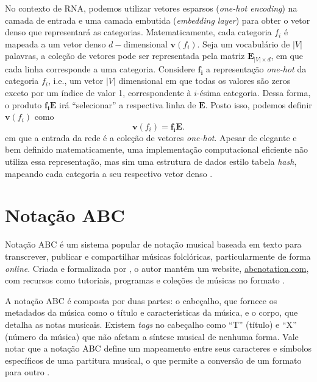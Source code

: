\documentclass{automatextcc}
\newcommand{\bs}[1]{\boldsymbol{#1}}
\begin{document}
No contexto de RNA, podemos utilizar vetores esparsos (\textit{one-hot encoding}) na camada de entrada e uma camada embutida (\textit{embedding layer}) para obter o vetor denso que representará as categorias. Matematicamente, cada categoria $f_i$ é mapeada a um vetor denso $d-$dimensional $\bs v(f_i)$. Seja um vocabulário de $|V|$ palavras, a coleção de vetores pode ser representada pela matriz $\bs{E}_{|V| \times d}$, em que cada linha corresponde a uma categoria. Considere $\bs{f_i}$ a representação \textit{one-hot} da categoria $f_i$, i.e., um vetor $|V|$ dimensional em que todas os valores são zeros exceto por um índice de valor 1, correspondente à $i$-ésima categoria. Dessa forma, o produto $\bs{f_i E}$ irá ``selecionar'' a respectiva linha de $\bs{E}$. Posto isso, podemos definir $\bs v(f_i)$ como
\begin{equation*}
    \bs v(f_i) = \bs{f_i E}.
\end{equation*}
em que a entrada da rede é a coleção de vetores \textit{one-hot}. Apesar de elegante e bem definido matematicamente, uma implementação computacional eficiente não utiliza essa representação, mas sim uma estrutura de dados estilo tabela \textit{hash}, mapeando cada categoria a seu respectivo vetor denso \citep{goldberg2017}.



\section{Notação ABC}
Notação ABC é um sistema popular de notação musical baseada em texto para transcrever, publicar e compartilhar músicas folclóricas, particularmente de forma \textit{online}. Criada e formalizada por \citet{walshaw1993}, o autor mantém um website, \href{https://abcnotation.com}{\url{abcnotation.com}}, com recursos como tutoriais, programas e coleções de músicas no formato \citep{walshaw2014}.

A notação ABC é composta por duas partes: o cabeçalho, que fornece os metadados da música como o título e características da música, e o corpo, que detalha as notas musicais. Existem \textit{tags} no cabeçalho como ``T'' (título) e ``X'' (número da música) que não afetam a síntese musical de nenhuma forma. Vale notar que a notação ABC define um mapeamento entre seus caracteres e símbolos específicos de uma partitura musical, o que permite a conversão de um formato para outro \citep{agarwala2017}. 
\end{document}
